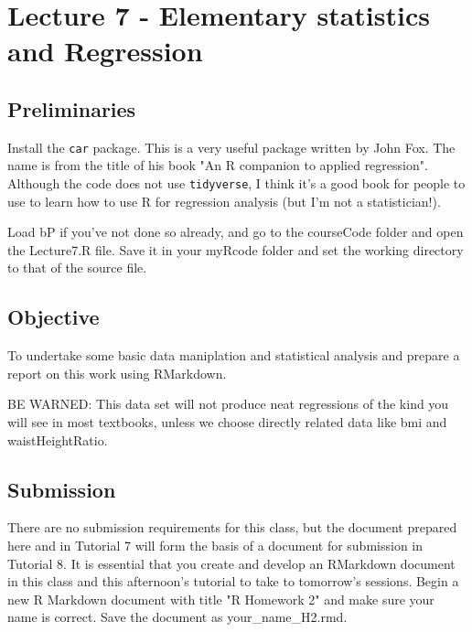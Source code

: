 \documentclass[titlepage]{book}\usepackage{knitr}
\begin{document}
\chapter{Lecture 7 -  Elementary statistics and Regression}

\author{Brian Williams $<$\href{mailto:bjw649@gmail.com}%
{bjw649@gmail.com}$>$}


\section{Preliminaries}
Install the \texttt{car} package. This is a very useful package written by John Fox. The name is from the title of his book "An R companion to applied regression".  Although the code does not use \texttt{tidyverse}, I think it's a good book for people to use to learn how to use R for regression analysis (but I'm not a statistician!).

Load bP if you've not done so already, and go to the courseCode folder and open the Lecture7.R file.  Save it in your myRcode folder and set the working directory to that of the source file.

\begin{knitrout}
\color{fgcolor}\begin{kframe}
\begin{alltt}
\hlstd{(}\hlstd{)}
\end{alltt}
\end{kframe}
\end{knitrout}


\section{Objective} 
To undertake some basic data maniplation and statistical analysis and prepare a report on this work using RMarkdown.  

BE WARNED: This data set will not produce neat regressions of the kind you will see in most textbooks, unless we choose directly related data like bmi and waistHeightRatio.

\section{Submission}

There are no submission requirements for this class, but the document prepared here and in Tutorial 7 will form the basis of a document for submission in Tutorial 8. It is essential that you create and develop an RMarkdown document in this class and this afternoon's tutorial to take to tomorrow's sessions. Begin a new R Markdown document with title "R Homework 2" and make sure your name is correct. Save the document as your\_name\_H2.rmd.
\end{document}
